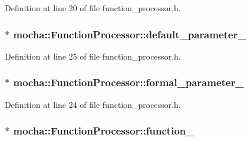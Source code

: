 Definition at line 20 of file function\_\-processor.h.

\hypertarget{classmocha_1_1_function_processor_a620a370dd5dfc1ce5960856ffbaffb63}{
\subsubsection[{default\_\-parameter\_\-}]{$\ast$ {\bf mocha::FunctionProcessor::default\_\-parameter\_\-}}}
\label{classmocha_1_1_function_processor_a620a370dd5dfc1ce5960856ffbaffb63}


Definition at line 25 of file function\_\-processor.h.

\hypertarget{classmocha_1_1_function_processor_a3cd96a2aa4d17c7c34fd5f7efd41ef84}{
\subsubsection[{formal\_\-parameter\_\-}]{$\ast$ {\bf mocha::FunctionProcessor::formal\_\-parameter\_\-}}}
\label{classmocha_1_1_function_processor_a3cd96a2aa4d17c7c34fd5f7efd41ef84}


Definition at line 24 of file function\_\-processor.h.

\hypertarget{classmocha_1_1_function_processor_a6960880e27df165e26343346ffdebd87}{
\subsubsection[{function\_\-}]{$\ast$ {\bf mocha::FunctionProcessor::function\_\-}}}
\label{classmocha_1_1_function_processor_a6960880e27df165e26343346ffdebd87}


